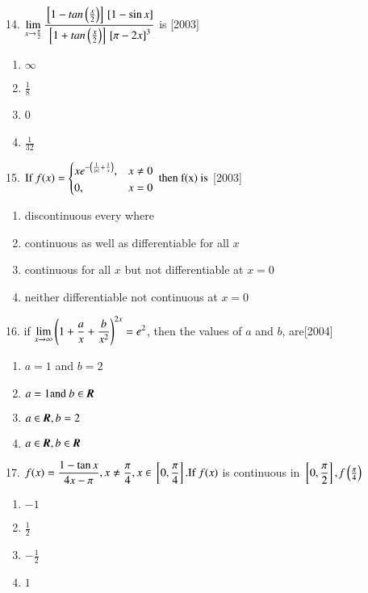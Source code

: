 \documentclass[journal,12pt,twocolumn]{IEEEtran}
\theoremstyle{remark}
\begin{document}
14. $\displaystyle \lim\limits_{x\to\frac{\pi}{2}}\frac{{}\left[1-tan\left(\frac{x}{2}\right)\right]{}\left[1-\sin x\right]}{ {}\left[1+tan\left(\frac{x}{2}\right)\right]{}\left[\pi-2x\right]^3}$ is \hfill [2003]

\begin{enumerate}
    \item $\infty$
    \item $\frac{1}{8}$
    \item 0
    \item $\frac{1}{32}$\\[2pt]
\end{enumerate}

15. $\displaystyle \text{If } f(x)=
    \begin{dcases}
	    xe^{- \left(\frac{1}{\left\vert x\right\vert} + \frac{1}{x} \right)},&x\neq 0\\ 
        0                                    ,&x = 0
    \end{dcases}
   \text{ then f(x) is}
$ \hfill [2003]

\begin{enumerate}
    \item discontinuous every where
    \item continuous as well as differentiable for all $x$
    \item continuous for all $x$ but not differentiable at $x=0$
    \item neither differentiable not continuous at $x=0$
\end{enumerate}

16. if $\displaystyle \lim\limits_{x\to\infty}\left(1+\frac{a}{x}+\frac{b}{x^2}\right)^{2x}=e^2$, then the values of $a$ and $b$, are\hfill [2004]

\begin{enumerate}
    \item $a=1$ and $b=2$
    \item $a=1 \text{and }b\in \textbf{\textit{R}}$
    \item $a\in \textbf{\textit{R}},b=2$
    \item $a\in \textbf{\textit{R}},b\in \textbf{\textit{R}}$\\[2pt]
\end{enumerate}

17. $\displaystyle f(x)=\frac{1-\tan x}{4x-\pi}, x\neq\frac{\pi}{4},x\in{}\left[0,\frac{\pi}{4}\right]\text{.If }f(x)$ is continuous in $\displaystyle{}\left[0,\frac{\pi}{2}\right],$$f\left(\frac{\pi}{4}\right)$

\begin{enumerate}
    \item $-1$
    \item $\frac{1}{2}$
    \item $-\frac{1}{2}$
    \item $1$\\[2pt]
\end{enumerate}
\end{document}
